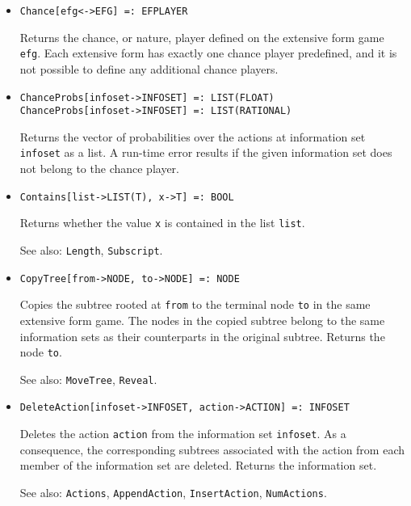 \begin{itemize}
\item
\protect \large \begin{verbatim}
Chance[efg<->EFG] =: EFPLAYER
\end{verbatim}\normalsize

\bd
Returns the chance, or nature, player defined on the
extensive form game \verb+efg+.  Each extensive form has exactly one
chance player predefined, and it is not possible to define any additional
chance players.
\ed

\item
\protect \large \begin{verbatim}
ChanceProbs[infoset->INFOSET] =: LIST(FLOAT)
ChanceProbs[infoset->INFOSET] =: LIST(RATIONAL)
\end{verbatim}\normalsize

\bd
Returns the vector of probabilities over the actions at
information set \verb+infoset+ as a list.  A run-time error results if
the given information set does not belong to the chance player.
\ed

\item
\protect \large \begin{verbatim}
Contains[list->LIST(T), x->T] =: BOOL
\end{verbatim}\normalsize

\bd
Returns whether the value \verb+x+ is contained in the list
\verb+list+.
\item
[See also:] {\tt Length}, {\tt Subscript}.
\ed

\item
\protect \large \begin{verbatim}
CopyTree[from->NODE, to->NODE] =: NODE
\end{verbatim}\normalsize

\bd
Copies the subtree rooted at \verb+from+ to the terminal
node \verb+to+ in the same extensive form game.  The nodes in the
copied subtree belong to the same information sets as their counterparts in
the original subtree.  Returns the node \verb+to+.
\item
[See also:] {\tt MoveTree}, {\tt Reveal}.
\ed


\item
\protect \large \begin{verbatim}
DeleteAction[infoset->INFOSET, action->ACTION] =: INFOSET
\end{verbatim}\normalsize

\bd
Deletes the action \verb+action+ from the information set
\verb+infoset+.  As a consequence, the corresponding subtrees associated
with the action from each member of the information set are deleted.
Returns the information set.
\item
[See also:] {\tt Actions}, {\tt AppendAction}, {\tt InsertAction},
{\tt NumActions}.
\ed


\end{itemize}
